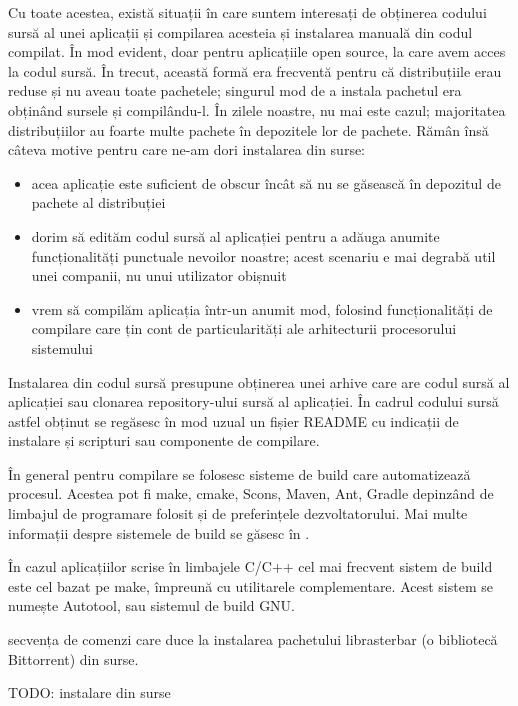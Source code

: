 Cu toate acestea, există situații în care suntem interesați de obținerea codului sursă al unei aplicații și compilarea acesteia și instalarea manuală din codul compilat. În mod evident, doar pentru aplicațiile open source, la care avem acces la codul sursă. În trecut, această formă era frecventă pentru că distribuțiile erau reduse și nu aveau toate pachetele; singurul mod de a instala pachetul era obținând sursele și compilându-l. În zilele noastre, nu mai este cazul; majoritatea distribuțiilor au foarte multe pachete în depozitele lor de pachete. Rămân însă câteva motive pentru care ne-am dori instalarea din surse:

\begin{itemize}
  \item acea aplicație este suficient de obscur încât să nu se găsească în depozitul de pachete al distribuției
  \item dorim să edităm codul sursă al aplicației pentru a adăuga anumite funcționalități punctuale nevoilor noastre; acest scenariu e mai degrabă util unei companii, nu unui utilizator obișnuit
  \item vrem să compilăm aplicația într-un anumit mod, folosind funcționalități de compilare care țin cont de particularități ale arhitecturii procesorului sistemului
\end{itemize}

Instalarea din codul sursă presupune obținerea unei arhive care are codul sursă al aplicației sau clonarea repository-ului sursă al aplicației. În cadrul codului sursă astfel obținut se regăsesc în mod uzual un fișier README cu indicații de instalare și scripturi sau componente de compilare.

În general pentru compilare se folosesc sisteme de build care automatizează procesul. Acestea pot fi make, cmake, Scons, Maven, Ant, Gradle depinzând de limbajul de programare folosit și de preferințele dezvoltatorului. Mai multe informații despre sistemele de build se găsesc în .

În cazul aplicațiilor scrise în limbajele C/C++ cel mai frecvent sistem de build este cel bazat pe make, împreună cu utilitarele complementare. Acest sistem se numește Autotool, sau sistemul de build GNU.

 secvența de comenzi care duce la instalarea pachetului librasterbar (o bibliotecă Bittorrent) din surse.

\begin{screen}[caption={Instalarea bibliotecii librasterbar din surse},label={lst:package:src-install}]
TODO: instalare din surse
\end{screen}

